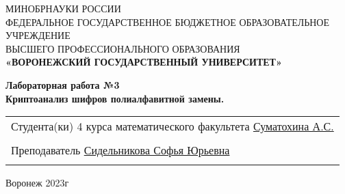 \thispagestyle{empty}
\begin{center}
	\hfill \break
	\large{МИНОБРНАУКИ РОССИИ}\\
	\footnotesize{ФЕДЕРАЛЬНОЕ ГОСУДАРСТВЕННОЕ БЮДЖЕТНОЕ ОБРАЗОВАТЕЛЬНОЕ УЧРЕЖДЕНИЕ}\\
	\footnotesize{ВЫСШЕГО ПРОФЕССИОНАЛЬНОГО ОБРАЗОВАНИЯ}\\
	\small{\textbf{«ВОРОНЕЖСКИЙ ГОСУДАРСТВЕННЫЙ УНИВЕРСИТЕТ»}}\\

	\hfill \break
	\hfill \break
	\hfill \break
	\hfill \break
	\hfill \break
	\hfill \break
	\hfill \break
	\hfill \break
	\hfill \break

	\large\textbf{Лабораторная работа №3}\\
	\large\textbf{ Криптоанализ шифров полиалфавитной замены.}\\
\end{center}

\hfill \break
\hfill \break
\hfill \break
\hfill \break
\hfill \break
\hfill \break
\hfill \break


\begin{tabular}{p{}}
	Студента(ки) 4 курса математического факультета \newline
	\underline{Суматохина А.С.} \\
	\\
	Преподаватель \newline
	\underline{Сидельникова Софья Юрьевна} \\                 \\
\end{tabular}

\hfill \break
\hfill \break
\hfill \break
\hfill \break
\hfill \break
\hfill \break
\hfill \break
\hfill \break
\hfill \break
\hfill \break
\begin{center}
	Воронеж 2023г
\end{center}
\newpage